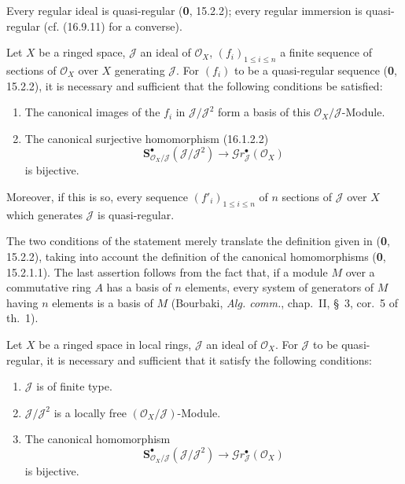 Every regular ideal is quasi-regular (\textbf{0}, 15.2.2); every regular immersion
is quasi-regular (cf. (16.9.11) for a converse).

\begin{proposition}[16.9.3]
\label{IV.16.9.3}
Let $X$ be a ringed space, $\mathscr{J}$ an ideal of $\mathcal{O}_X$,
$(f_i)_{1\leq i\leq n}$ a finite sequence of sections of $\mathcal{O}_X$
over $X$ generating $\mathscr{J}$. For $(f_i)$ to be a quasi-regular
sequence \textup{(\textbf{0}, 15.2.2)}, it is necessary and sufficient that the following
conditions be satisfied:
\begin{enumerate}
  \item[\textup{(i)}] The canonical images of the $f_i$ in
  $\mathscr{J}/\mathscr{J}^2$ form a basis of this
  $\mathcal{O}_X/\mathscr{J}$-Module.
  \item[\textup{(ii)}] The canonical surjective homomorphism \textup{(16.1.2.2)}
  \[
    \mathbf{S}_{\mathcal{O}_X/\mathscr{J}}^{\bullet}
    (\mathscr{J}/\mathscr{J}^2)
    \longrightarrow\mathscr{G}r_{\mathscr{J}}^{\bullet}(\mathcal{O}_X)
  \]
  is bijective.
\end{enumerate}
Moreover, if this is so, every sequence $(f'_i)_{1\leq i\leq n}$ of $n$
sections of $\mathscr{J}$ over $X$ which generates $\mathscr{J}$ is
quasi-regular.
\end{proposition}


The two conditions of the statement merely translate the definition given in
(\textbf{0}, 15.2.2), taking into account the definition of the canonical
homomorphisms (\textbf{0}, 15.2.1.1). The last assertion follows from the fact that,
if a module $M$ over a commutative ring $A$ has a basis of $n$ elements,
every system of generators of $M$ having $n$ elements is a basis of $M$
(Bourbaki, \emph{Alg. comm.}, chap.~II, §~3, cor.~5 of th.~1).

\begin{corollary}[16.9.4]
\label{IV.16.9.4}
Let $X$ be a ringed space in local rings, $\mathscr{J}$ an ideal of
$\mathcal{O}_X$. For $\mathscr{J}$ to be quasi-regular, it is necessary and
sufficient that it satisfy the following conditions:
\begin{enumerate}
  \item[\textup{(i)}] $\mathscr{J}$ is of finite type.
  \item[\textup{(ii)}] $\mathscr{J}/\mathscr{J}^2$ is a locally free
  $(\mathcal{O}_X/\mathscr{J})$-Module.
  \item[\textup{(iii)}] The canonical homomorphism
  \[
    \mathbf{S}_{\mathcal{O}_X/\mathscr{J}}^{\bullet}
    (\mathscr{J}/\mathscr{J}^2)
    \longrightarrow\mathscr{G}r_{\mathscr{J}}^{\bullet}(\mathcal{O}_X)
    \tag{16.9.4.1}
    \label{IV.16.9.4.1}
  \]
  is bijective.
\end{enumerate}
\end{corollary}

